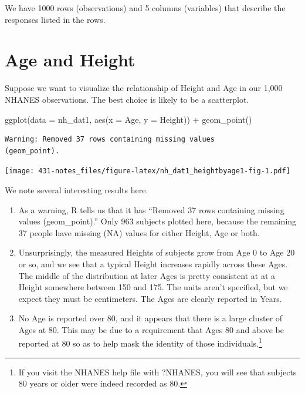 \documentclass[
]{book}
\newenvironment{Shaded}{\begin{snugshade}}{\end{snugshade}}
\newcommand{\AttributeTok}[1]{\textcolor[rgb]{0.77,0.63,0.00}{#1}}
\newcommand{\FunctionTok}[1]{\textcolor[rgb]{0.00,0.00,0.00}{#1}}
\newcommand{\NormalTok}[1]{#1}
\newcommand{\SpecialCharTok}[1]{\textcolor[rgb]{0.00,0.00,0.00}{#1}}
\providecommand{\tightlist}{%
  \setlength{\itemsep}{0pt}\setlength{\parskip}{0pt}}
\begin{document}
We have 1000 rows (observations) and 5 columns (variables) that describe the responses listed in the rows.

\hypertarget{age-and-height}{%
\section{Age and Height}\label{age-and-height}}

Suppose we want to visualize the relationship of Height and Age in our 1,000 NHANES observations. The best choice is likely to be a scatterplot.

\begin{Shaded}
\begin{Highlighting}[]
\FunctionTok{ggplot}\NormalTok{(}\AttributeTok{data =}\NormalTok{ nh\_dat1, }\FunctionTok{aes}\NormalTok{(}\AttributeTok{x =}\NormalTok{ Age, }\AttributeTok{y =}\NormalTok{ Height)) }\SpecialCharTok{+}
    \FunctionTok{geom\_point}\NormalTok{()}
\end{Highlighting}
\end{Shaded}

\begin{verbatim}
Warning: Removed 37 rows containing missing values
(geom_point).
\end{verbatim}

\texttt{[image: 431-notes\_files/figure-latex/nh\_dat1\_heightbyage1-fig-1.pdf]}

We note several interesting results here.

\begin{enumerate}
\def\labelenumi{\arabic{enumi}.}
\tightlist
\item
  As a warning, R tells us that it has ``Removed 37 rows containing missing values (geom\_point).'' Only 963 subjects plotted here, because the remaining 37 people have missing (NA) values for either Height, Age or both.
\item
  Unsurprisingly, the measured Heights of subjects grow from Age 0 to Age 20 or so, and we see that a typical Height increases rapidly across these Ages. The middle of the distribution at later Ages is pretty consistent at at a Height somewhere between 150 and 175. The units aren't specified, but we expect they must be centimeters. The Ages are clearly reported in Years.
\item
  No Age is reported over 80, and it appears that there is a large cluster of Ages at 80. This may be due to a requirement that Ages 80 and above be reported at 80 so as to help mask the identity of those individuals.\footnote{If you visit the NHANES help file with ?NHANES, you will see that subjects 80 years or older were indeed recorded as 80.}
\end{enumerate}
\end{document}
